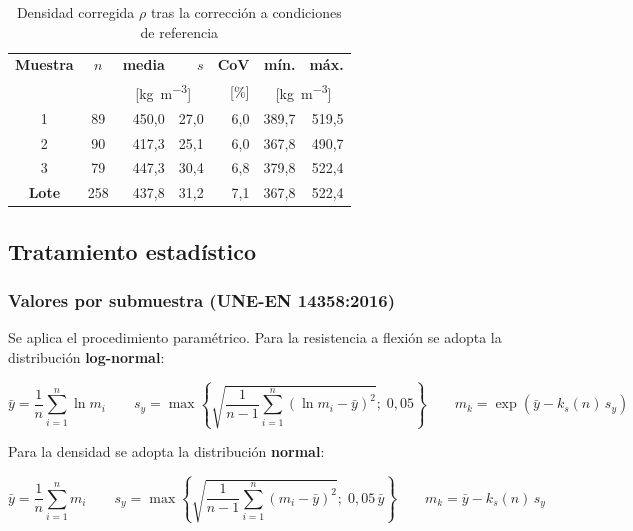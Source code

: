 \documentclass[11pt,a4paper]{article}
\begin{document}
\begin{table}[H]
\centering
\caption[Densidad corregida $\rho$ tras la corrección a condiciones de referencia]{Densidad corregida $\rho$ tras la corrección a condiciones de referencia}
\begin{tabular}{c c r r r r r}
\toprule
\textbf{Muestra} & \textbf{$n$} & \textbf{media} & \textbf{$s$} & \textbf{CoV} & \textbf{mín.} & \textbf{máx.} \\
 & & \multicolumn{2}{c}{[\si{\kilo\gram\per\cubic\meter}]} & [\si{\percent}] & \multicolumn{2}{c}{[\si{\kilo\gram\per\cubic\meter}]} \\
\midrule
1 & 89 & 450,0 & 27,0 & 6,0 & 389,7 & 519,5 \\
2 & 90 & 417,3 & 25,1 & 6,0 & 367,8 & 490,7 \\
3 & 79 & 447,3 & 30,4 & 6,8 & 379,8 & 522,4 \\
\textbf{Lote} & 258 & 437,8 & 31,2 & 7,1 & 367,8 & 522,4 \\
\bottomrule
\end{tabular}
\end{table}

\subsection{Tratamiento estadístico}

\subsubsection{Valores por submuestra (UNE-EN 14358:2016)}

Se aplica el procedimiento paramétrico. Para la resistencia a flexión se adopta la
distribución \textbf{log-normal}:

\begin{equation}
\bar{y} = \frac{1}{n}\sum_{i=1}^{n}\ln m_{i}
\qquad
s_{y} = \max\left\{ \sqrt{\frac{1}{n-1}\sum_{i=1}^{n}(\ln m_{i} - \bar{y})^{2}} ;\; 0{,}05 \right\}
\qquad
m_{k} = \exp\!\left(\bar{y} - k_{s}(n)\,s_{y}\right)
\tag{14358-1, 14358-3 y 14358-5}\label{eq:lognormal}
\end{equation}

\noindent Para la densidad se adopta la distribución \textbf{normal}:

\begin{equation}
\bar{y} = \frac{1}{n}\sum_{i=1}^{n} m_{i}
\qquad
s_{y} = \max\left\{ \sqrt{\frac{1}{n-1}\sum_{i=1}^{n}(m_{i} - \bar{y})^{2}} ;\; 0{,}05\,\bar{y} \right\}
\qquad
m_{k} = \bar{y} - k_{s}(n)\,s_{y}
\tag{14358-2, 14358-4 y 14358-6}\label{eq:normal}
\end{equation}
\end{document}
